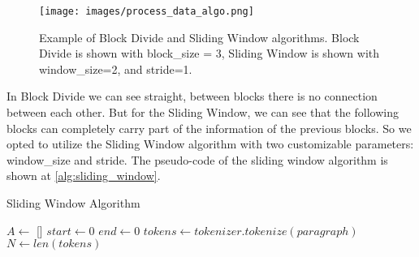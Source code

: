 \documentclass[conference]{IEEEtran}
\begin{document}
\begin{figure}[ht]
    \centerline{\texttt{[image: images/process\_data\_algo.png]}}
    \caption{Example of Block Divide and Sliding Window algorithms. Block Divide is shown with block\_size = 3, Sliding Window is shown with window\_size=2, and stride=1.}
    \label{fig:data_process_algorithm}
\end{figure}

In Block Divide we can see straight, between blocks there is no connection between each other. But for the Sliding Window, we can see that the following blocks can completely carry part of the information of the previous blocks. So we opted to utilize the Sliding Window algorithm with two customizable parameters: window\_size and stride. The pseudo-code of the sliding window algorithm is shown at \ref{alg:sliding_window}.

\begin{algorithm}
    \caption{Sliding Window Algorithm}\label{alg:sliding_window}
    \vspace{0.15cm}
    \vspace{0.15cm}
    $A \gets $ []\;
    $start \gets 0$\;
    $end \gets 0$\;
    $tokens \gets tokenizer.tokenize(paragraph)$\;
    $N \gets len(tokens)$\;
    \vspace{0.15cm}
\end{algorithm}

        
\end{document}
